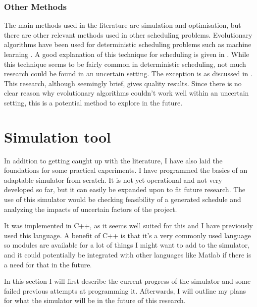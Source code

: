 \documentclass[a4paper,12pt]{article}
\begin{document}
\subsubsection{Other Methods} \label{ss:otmet}
The main methods used in the literature are simulation and optimisation, but there are other relevant methods used in other scheduling problems. Evolutionary algorithms have been used for deterministic scheduling problems such as machine learning \cite{dorndorf1995evolution}. A good explanation of this technique for scheduling is given in \cite{cotta2007memetic}. While this technique seems to be fairly common in deterministic scheduling, not much research could be found in an uncertain setting. The exception is \cite{sevaux2002genetic} as discussed in . This research, although seemingly brief, gives quality results. Since there is no clear reason why evolutionary algorithms couldn't work well within an uncertain setting, this is a potential method to explore in the future. 


\pagebreak

\section{Simulation tool} \label{s:sim}
In addition to getting caught up with the literature, I have also laid the foundations for some practical experiments. I have programmed the basics of an adaptable simulator from scratch. It is not yet operational and not very developed so far, but it can easily be expanded upon to fit future research. The use of this simulator would be checking feasibility of a generated schedule and analyzing the impacts of uncertain factors of the project.

It was implemented in C++, as it seems well suited for this and I have previously used this language. A benefit of C++ is that it's a very commonly used language so modules are available for a lot of things I might want to add to the simulator, and it could potentially be integrated with other languages like Matlab if there is a need for that in the future. 

In this section I will first describe the current progress of the simulator and some failed previous attempts at programming it. Afterwards, I will outline my plans for what the simulator will be in the future of this research.
\end{document}
